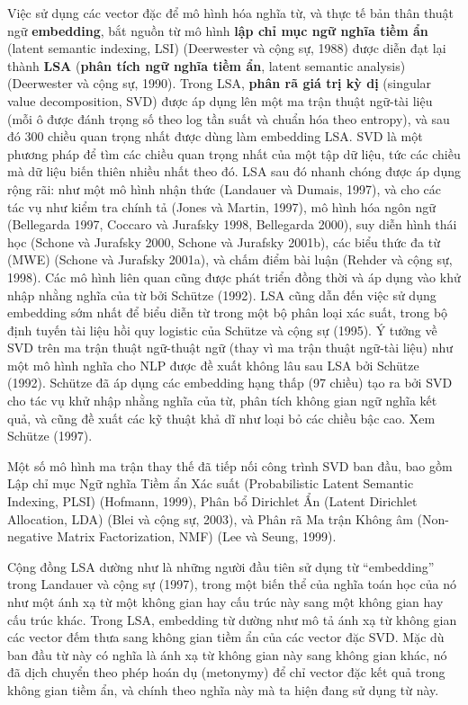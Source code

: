 Việc sử dụng các vector đặc để mô hình hóa nghĩa từ, và thực tế bản thân thuật ngữ \textbf{embedding}, bắt nguồn từ mô hình \textbf{lập chỉ mục ngữ nghĩa tiềm ẩn} (latent semantic indexing, LSI) (Deerwester và cộng sự, 1988) được diễn đạt lại thành \textbf{LSA} (\textbf{phân tích ngữ nghĩa tiềm ẩn}, latent semantic analysis) (Deerwester và cộng sự, 1990). Trong LSA, \textbf{phân rã giá trị kỳ dị} (singular value decomposition, SVD) được áp dụng lên một ma trận thuật ngữ-tài liệu (mỗi ô được đánh trọng số theo log tần suất và chuẩn hóa theo entropy), và sau đó 300 chiều quan trọng nhất được dùng làm embedding LSA. SVD là một phương pháp để tìm các chiều quan trọng nhất của một tập dữ liệu, tức các chiều mà dữ liệu biến thiên nhiều nhất theo đó. LSA sau đó nhanh chóng được áp dụng rộng rãi: như một mô hình nhận thức (Landauer và Dumais, 1997), và cho các tác vụ như kiểm tra chính tả (Jones và Martin, 1997), mô hình hóa ngôn ngữ (Bellegarda 1997, Coccaro và Jurafsky 1998, Bellegarda 2000), suy diễn hình thái học (Schone và Jurafsky 2000, Schone và Jurafsky 2001b), các biểu thức đa từ (MWE) (Schone và Jurafsky 2001a), và chấm điểm bài luận (Rehder và cộng sự, 1998). Các mô hình liên quan cũng được phát triển đồng thời và áp dụng vào khử nhập nhằng nghĩa của từ bởi Schütze (1992). LSA cũng dẫn đến việc sử dụng embedding sớm nhất để biểu diễn từ trong một bộ phân loại xác suất, trong bộ định tuyến tài liệu hồi quy logistic của Schütze và cộng sự (1995). Ý tưởng về SVD trên ma trận thuật ngữ-thuật ngữ (thay vì ma trận thuật ngữ-tài liệu) như một mô hình nghĩa cho NLP được đề xuất không lâu sau LSA bởi Schütze (1992). Schütze đã áp dụng các embedding hạng thấp (97 chiều) tạo ra bởi SVD cho tác vụ khử nhập nhằng nghĩa của từ, phân tích không gian ngữ nghĩa kết quả, và cũng đề xuất các kỹ thuật khả dĩ như loại bỏ các chiều bậc cao. Xem Schütze (1997).

Một số mô hình ma trận thay thế đã tiếp nối công trình SVD ban đầu, bao gồm Lập chỉ mục Ngữ nghĩa Tiềm ẩn Xác suất (Probabilistic Latent Semantic Indexing, PLSI) (Hofmann, 1999), Phân bổ Dirichlet Ẩn (Latent Dirichlet Allocation, LDA) (Blei và cộng sự, 2003), và Phân rã Ma trận Không âm (Non-negative Matrix Factorization, NMF) (Lee và Seung, 1999).

Cộng đồng LSA dường như là những người đầu tiên sử dụng từ ``embedding'' trong Landauer và cộng sự (1997), trong một biến thể của nghĩa toán học của nó như một ánh xạ từ một không gian hay cấu trúc này sang một không gian hay cấu trúc khác. Trong LSA, embedding từ dường như mô tả ánh xạ từ không gian các vector đếm thưa sang không gian tiềm ẩn của các vector đặc SVD. Mặc dù ban đầu từ này có nghĩa là ánh xạ từ không gian này sang không gian khác, nó đã dịch chuyển theo phép hoán dụ (metonymy) để chỉ vector đặc kết quả trong không gian tiềm ẩn, và chính theo nghĩa này mà ta hiện đang sử dụng từ này.

